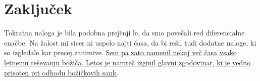 \documentclass{article}
\begin{document}
\section{Zaključek}
Tokratna naloga je bila podobna prejšnji le, da smo povečali red diferencialne enačbe. Na žalost mi sicer ni uspelo najti časa, da bi rešil tudi dodatne naloge, ki so izgledale kar precej zanimive. 
\href{https://adventofcode.com/2024}{Sem pa zato namenil nekaj več časa vsako letnemu reševanju božiča. Letos je namreč izginil glavni zgodovinar, ki je vedno prisoten pri odhodu božičkovih sank}.
\end{document}
